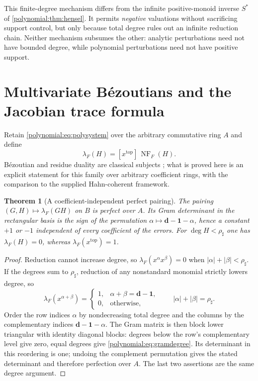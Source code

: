 \documentclass[11pt,letterpaper]{article}
\numberwithin{equation}{section}
\newtheorem{theorem}{Theorem}[section]
\theoremstyle{definition}
\theoremstyle{remark}\newtheorem{remark}[theorem]{Remark}
\newcommand{\NF}{\operatorname{NF}}
\begin{document}
This finite-degree mechanism differs from the infinite positive-monoid inverse
$S^*$ of \cref{polynomial:thm:hensel}. It permits \emph{negative} valuations
without sacrificing support control, but only because total degree rules out
an infinite reduction chain. Neither mechanism subsumes the other: analytic
perturbations need not have bounded degree, while polynomial perturbations
need not have positive support.

\section{Multivariate B\'ezoutians and the Jacobian trace formula}
\label{polynomial:sec:bezoutian}
Retain \eqref{polynomial:eq:polysystem} over the arbitrary commutative ring
$A$ and define
\begin{equation}\label{polynomial:eq:multilambda}
 \lambda_F(H)=[x^{\mathrm{top}}]\,\NF_F(H).
\end{equation}
B\'ezoutian and residue duality are classical subjects
\cite{polynomial:BCRS,polynomial:BMP}; what is proved here is an explicit
statement for this family over arbitrary coefficient rings, with the
comparison to the supplied Hahn-coherent framework.

\begin{theorem}[A coefficient-independent perfect pairing]
\label{polynomial:thm:multiperfect}
The pairing $(G,H)\mapsto\lambda_F(GH)$ on $B$ is perfect over $A$. Its Gram
determinant in the rectangular basis is the sign of the permutation
$\alpha\mapsto\boldsymbol d-\boldsymbol1-\alpha$, hence a constant $+1$ or
$-1$ independent of every coefficient of the errors. For $\deg H<\rho_\sharp$
one has $\lambda_F(H)=0$, whereas $\lambda_F(x^{\mathrm{top}})=1$.
\end{theorem}
\begin{proof}
Reduction cannot increase degree, so $\lambda_F(x^\alpha x^\beta)=0$ when
$|\alpha|+|\beta|<\rho_\sharp$. If the degrees sum to $\rho_\sharp$, reduction
of any nonstandard monomial strictly lowers degree, so
\begin{equation}\label{polynomial:eq:gramdegree}
 \lambda_F(x^{\alpha+\beta})=
 \begin{cases}1,&\alpha+\beta=\boldsymbol d-\boldsymbol1,\\
 0,&\text{otherwise},\end{cases}
 \qquad |\alpha|+|\beta|=\rho_\sharp .
\end{equation}
Order the row indices $\alpha$ by nondecreasing total degree and the columns
by the complementary indices $\boldsymbol d-\boldsymbol1-\alpha$. The Gram
matrix is then block lower triangular with identity diagonal blocks: degrees
below the row's complementary level give zero, equal degrees give
\eqref{polynomial:eq:gramdegree}. Its determinant in this reordering is one;
undoing the complement permutation gives the stated determinant and therefore
perfection over $A$. The last two assertions are the same degree argument.
\end{proof}
\end{document}
